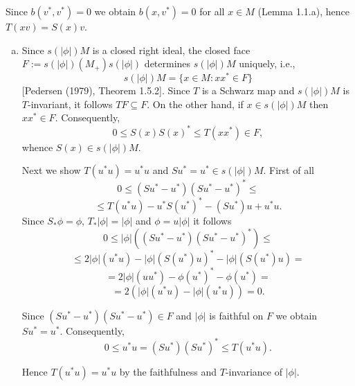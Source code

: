 Since $b(v^{*},v^{*}) = 0$ we obtain $b(x,v^{*}) = 0$ for all $x \in M$ (Lemma 1.1.a), hence $T(xv) = S(x)v$.

\begin{enumerate}[(a)]
\item 
Since $s(|\phi|)M$ is a closed right ideal, the closed face $F := s(|\phi|)(M_{+})s(|\phi|)$ determines $s(|\phi|)M$ uniquely, i.e.,
\[
s(|\phi|)M = \{x \in M : xx^{*} \in F\}
\]
[Pedersen (1979), Theorem 1.5.2].
Since $T$ is a Schwarz map and $s(|\phi|)M$ is $T$-invariant, it follows $TF \subseteq F$.
On the other hand, if $x \in s(|\phi|)M$ then $xx^{*} \in F$.
Consequently,
\[
0 \leq S(x)S(x)^{*} \leq T(xx^{*}) \in F,
\]
whence $S(x) \in s(|\phi|)M$.

Next we show $T(u^{*}u) = u^{*}u$ and $Su^{*} = u^{*} \in s(|\phi|)M$.
First of all
\[
0 \leq (Su^{*} - u^{*})(Su^{*} - u^{*})^{*} \leq
\]
\[
\leq T(u^{*}u) - u^{*}S(u^{*})^{*} - (Su^{*})u + u^{*}u.
\]
Since $S_{*}\phi = \phi$, $T_{*}|\phi| = |\phi|$ and $\phi = u|\phi|$ it follows
\[
0 \leq |\phi|((Su^{*} - u^{*})(Su^{*} - u^{*})^{*}) \leq
\]
\[
\leq 2|\phi|(u^{*}u) - |\phi|(S(u^{*})u)^{*} - |\phi|(S(u^{*})u) =
\]
\[
= 2|\phi|(uu^{*}) - \phi(u^{*})^{*} - \phi(u^{*}) =
\]
\[
= 2(|\phi|(u^{*}u) - |\phi|(u^{*}u)) = 0.
\]

Since $(Su^{*} - u^{*})(Su^{*} - u^{*}) \in F$ and $|\phi|$ is faithful on $F$ we obtain $Su^{*} = u^{*}$.
Consequently,
\[
0 \leq u^{*}u = (Su^{*})(Su^{*})^{*} \leq T(u^{*}u).
\]

Hence $T(u^{*}u) = u^{*}u$ by the faithfulness and $T$-invariance of $|\phi|$.
\end{enumerate}
